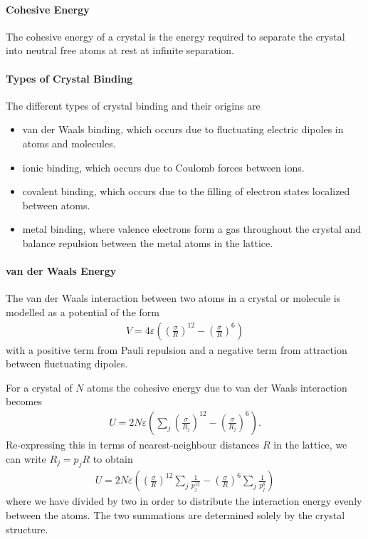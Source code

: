 \paragraph{Cohesive Energy}
The cohesive energy of a crystal is the energy required to separate the crystal into neutral free atoms at rest at infinite separation.

\paragraph{Types of Crystal Binding}
The different types of crystal binding and their origins are
\begin{itemize}
	\item van der Waals binding, which occurs due to fluctuating electric dipoles in atoms and molecules.
	\item ionic binding, which occurs due to Coulomb forces between ions.
	\item covalent binding, which occurs due to the filling of electron states localized between atoms.
	\item metal binding, where valence electrons form a gas throughout the crystal and balance repulsion between the metal atoms in the lattice.
\end{itemize}

\paragraph{van der Waals Energy}
The van der Waals interaction between two atoms in a crystal or molecule is modelled as a potential of the form
\begin{align*}
	V = 4\varepsilon\left(\left(\frac{\sigma}{R}\right)^{12} - \left(\frac{\sigma}{R}\right)^{6}\right)
\end{align*}
with a positive term from Pauli repulsion and a negative term from attraction between fluctuating dipoles.

For a crystal of $N$ atoms the cohesive energy due to van der Waals interaction becomes
\begin{align*}
	U = 2N\varepsilon\left(\sum\limits_{j}\left(\frac{\sigma}{R_{j}}\right)^{12} - \left(\frac{\sigma}{R_{j}}\right)^{6}\right).
\end{align*}
Re-expressing this in terms of nearest-neighbour distances $R$ in the lattice, we can write $R_{j} = p_{j}R$ to obtain
\begin{align*}
	U = 2N\varepsilon\left(\left(\frac{\sigma}{R}\right)^{12}\sum\limits_{j}\frac{1}{p_{j}^{12}} - \left(\frac{\sigma}{R}\right)^{6}\sum\limits_{j}\frac{1}{p_{j}^{6}}\right)
\end{align*}
where we have divided by two in order to distribute the interaction energy evenly between the atoms. The two summations are determined solely by the crystal structure.

